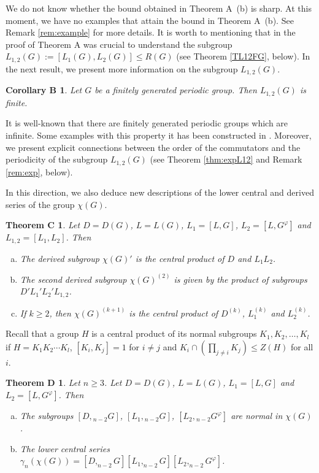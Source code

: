 \documentclass[12pt,leqno]{amsart}
\newtheorem*{corB}{Corollary B}
\newtheorem*{thmC}{Theorem C}
\newtheorem*{thmD}{Theorem D}
\begin{document}
We do not know whether the bound obtained in Theorem A~(b) is sharp. At this moment, we have no examples that attain the bound in Theorem A~(b). See Remark \ref{rem:example} for more details. It is worth to mentioning that in the proof of Theorem A was crucial to understand the subgroup $L_{1,2}(G) := [L_1(G), L_2(G)] \leq R(G)$ (see Theorem \ref{TL12FG}, below). In the next result, we present more information on the subgroup $L_{1,2}(G)$. 

\begin{corB}
Let $G$ be a finitely generated periodic group. Then $L_{1,2}(G)$ is finite.     
\end{corB}

It is well-known that there are finitely generated periodic  groups which are infinite. Some examples with this property it has been constructed in \cite{Aleshin,Gri,G,GS,S}. Moreover, we present explicit connections between the order of the commutators and the periodicity of the subgroup $L_{1,2}(G)$ (see Theorem \ref{thm:expL12} and Remark \ref{rem:exp}, below).

In this direction, we also deduce new descriptions of the lower central and derived series of the group $\chi(G)$.  

\begin{thmC}\label{thm:derived}
Let $D = D(G)$, $L=L(G)$, $L_1 = [L,G]$, $L_2 = [L,G^{\varphi}]$ and $L_{1,2} = [L_1,L_2]$. Then   
\begin{enumerate}[(a)]
    \item The derived subgroup $\chi(G)'$ is the central product of  $D$ and  $L_1L_2$.
    \item The second derived subgroup $\chi(G)^{(2)}$ is given by the product of subgroups $D'L_1'L_2'L_{1,2}$.
    \item If $k \geq 2$, then $\chi(G)^{(k+1)}$ is the central product of $D^{(k)}$, $ L_1^{(k)}$ and $L_2^{(k)}$.
\end{enumerate}
\end{thmC}

Recall that a group $H$ is a central product of its normal subgroups $K_1, K_2, \ldots, K_l$ if $H=K_1 K_2 \cdots K_l$, $[K_i,K_j]=1$ for $i\neq j$ and $K_i \cap \left(\prod_{j\neq i}K_j\right) \leq Z(H)$ for all $i$.

\begin{thmD}
Let $n \geq 3$. Let $D = D(G)$, $L=L(G)$, $L_1 = [L,G]$ and $L_2 = [L,G^{\varphi}]$. Then 
\begin{enumerate}[(a)]
    \item The subgroups $[D,{}_{n-2}G]$, $[L_1,{}_{n-2} G]$, $[L_2,{}_{n-2} G^{\varphi}]$ are normal in $\chi(G)$. 
    \item The lower central series $\gamma_n\left(\chi(G)\right)=[D,_{n-2}G][L_1,_{n-2}G][L_2,_{n-2}G^{\varphi}]$.     
\end{enumerate}
\end{thmD}
\end{document}
